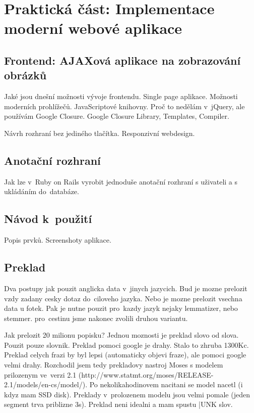 \chapter{Praktická část: Implementace moderní webové aplikace}

\section{Frontend: AJAXová aplikace na zobrazování obrázků}

Jaké jsou dnešní možnosti vývoje frontendu. Single page aplikace. Možnosti moderních prohlížečů. JavaScriptové knihovny. Proč to nedělám v~jQuery, ale používám Google Closure. Google Closure Library, Templates, Compiler.

Návrh rozhraní bez jediného tlačítka. Responzivní webdesign.

\section{Anotační rozhraní}

Jak lze v~Ruby on Rails vyrobit jednoduše anotační rozhraní s uživateli a s ukládáním do~databáze.

\section{Návod k~použití}

Popis prvků. Screenshoty aplikace.

\section{Preklad}

Dva postupy jak pouzit anglicka data v~jinych jazycich. Bud je mozne prelozit vzdy zadany cesky dotaz do~ciloveho jazyka. Nebo je mozne prelozit vsechna data u fotek. Pak je nutne pouzit pro~kazdy jazyk nejaky lemmatizer, nebo stemmer. pro~cestinu jsme nakonec zvolili druhou variantu.

Jak prelozit 20 milionu popisku? Jednou moznosti je preklad slovo od slova. Pouzit pouze slovnik. Preklad pomoci google je drahy. Stalo to zhruba 1300Kc. Preklad celych frazi by byl lepsi (automaticky objevi fraze), ale pomoci google velmi drahy. Rozchodil jsem tedy prekladovy nastroj Moses s modelem prilozenym ve~verzi 2.1 (http://www.statmt.org/moses/RELEASE-2.1/models/en-cs/model/). Po nekolikahodinovem nacitani se model nacetl (i kdyz mam SSD disk). Preklady v~prolozenem modelu jsou velmi pomale (jeden segment trva priblizne 3s). Preklad neni idealni a mam spustu |UNK slov.

